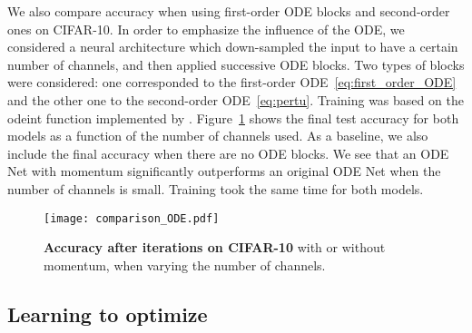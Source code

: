 \documentclass{article}
\begin{document}
We also compare accuracy when using first-order ODE blocks \citep{chen2018neural} and second-order ones on CIFAR-10. In order to emphasize the influence of the ODE, we considered a neural architecture which down-sampled the input to have a certain number of channels, and then applied  successive ODE blocks. Two types of blocks were considered: one corresponded to the first-order ODE~\eqref{eq:first_order_ODE} and the other one to the second-order ODE~\eqref{eq:pertu}. Training was based on the odeint function implemented by \citet{chen2018neural}.
Figure~\ref{fig:continuous_CIFAR_10} shows the final test accuracy for both models as a function of the number of channels used. As a baseline, we also include the final accuracy when there are no ODE blocks. We see that an ODE Net with momentum significantly outperforms an original ODE Net when the number of channels is small. Training took the same time for both models. 
\begin{figure}[ht]
\begin{minipage}[c]{0.6\linewidth}
        \texttt{[image: comparison\_ODE.pdf]}
    \end{minipage}\hfill
    \begin{minipage}[c]{0.35\linewidth}
        \vspace{-1em}
    \caption{\textbf{Accuracy after  iterations on CIFAR-10} with or without momentum, when varying the number of channels.}\label{fig:continuous_CIFAR_10}
    \end{minipage}
    \vspace{-1em}
\end{figure} 









\subsection{Learning to optimize}
\label{sec-numerics-lista}
\end{document}
